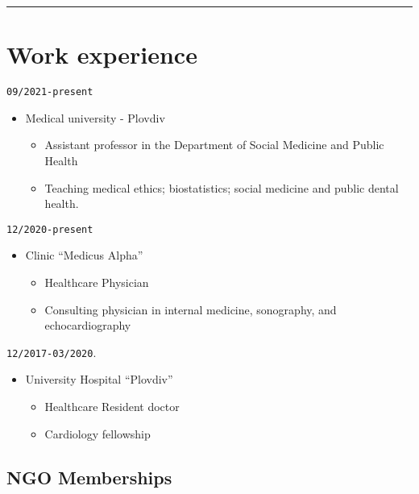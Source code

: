 \documentclass[
  12pt,
  letterpaper,
  DIV=11,
  numbers=noendperiod]{scrartcl}
\providecommand{\tightlist}{%
  \setlength{\itemsep}{0pt}\setlength{\parskip}{0pt}}\usepackage{longtable,booktabs,array}
\begin{document}
\begin{center}\rule{0.5\linewidth}{0.5pt}\end{center}

\section{Work experience}\label{work-experience}

\texttt{09/2021-present}

\begin{itemize}
\tightlist
\item
  Medical university - Plovdiv

  \begin{itemize}
  \tightlist
  \item
    Assistant professor in the Department of Social Medicine and Public
    Health
  \item
    Teaching medical ethics; biostatistics; social medicine and public
    dental health.
  \end{itemize}
\end{itemize}

\texttt{12/2020-present}

\begin{itemize}
\tightlist
\item
  Clinic ``Medicus Alpha''

  \begin{itemize}
  \tightlist
  \item
    Healthcare \textbar{} Physician
  \item
    Consulting physician in internal medicine, sonography, and
    echocardiography
  \end{itemize}
\end{itemize}

\texttt{12/2017-03/2020}.

\begin{itemize}
\tightlist
\item
  University Hospital ``Plovdiv''

  \begin{itemize}
  \tightlist
  \item
    Healthcare \textbar{} Resident doctor
  \item
    Cardiology fellowship
  \end{itemize}
\end{itemize}

\subsection{NGO Memberships}\label{ngo-memberships}
\end{document}
